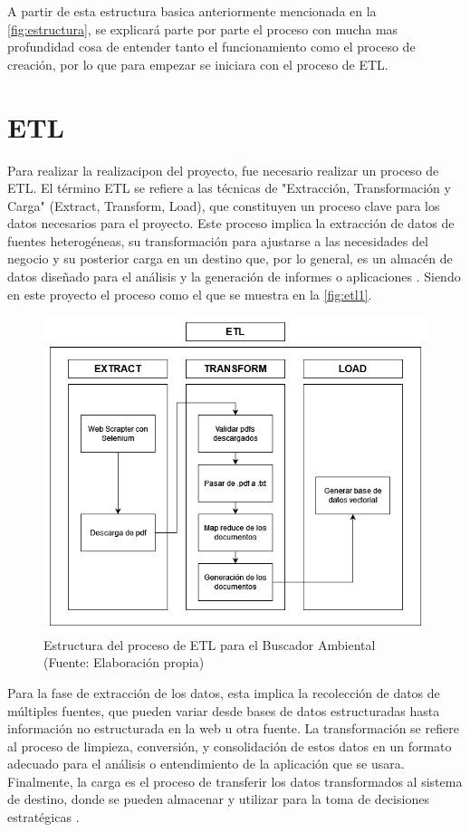 A partir de esta estructura basica anteriormente mencionada en la \autoref{fig:estructura}, se explicará parte 
por parte el proceso con mucha mas profundidad cosa de entender tanto el funcionamiento como el proceso de creación, 
por lo que para empezar se iniciara con el proceso de ETL.



\section{ETL}


Para realizar la realizacipon del proyecto, fue necesario realizar un proceso de ETL. El término ETL se refiere a las técnicas de "Extracción, 
Transformación y Carga" (Extract, Transform, Load), que constituyen un proceso clave para los datos necesarios para el proyecto. 
Este proceso implica la extracción de datos de fuentes heterogéneas, su transformación para ajustarse a las necesidades del 
negocio y su posterior carga en un destino que, por lo general, es un almacén de datos diseñado para el análisis y la generación 
de informes o aplicaciones \cite{ETL1}. Siendo en este proyecto el proceso como el que se muestra en la \autoref{fig:etl1}.

\begin{figure}[ht!]
    \centering
    \includegraphics[width=.7\textwidth]{figures/huemulETL.png}
    \caption[Estructura del proceso de ETL para el Buscador Ambiental]{Estructura del proceso de ETL para el Buscador Ambiental\\
    {\scriptsize (Fuente: Elaboración propia)}}
    \label{fig:etl1}
\end{figure}
    

Para la fase de extracción de los datos, esta implica la recolección de datos de múltiples fuentes, que pueden variar desde bases de datos 
estructuradas hasta información no estructurada en la web u otra fuente. La transformación se refiere al proceso de limpieza, conversión, 
y consolidación de estos datos en un formato adecuado para el análisis o entendimiento de la aplicación que se usara. Finalmente, la carga es el proceso de transferir 
los datos transformados al sistema de destino, donde se pueden almacenar y utilizar para la toma de decisiones estratégicas 
\cite{ETL1}.

